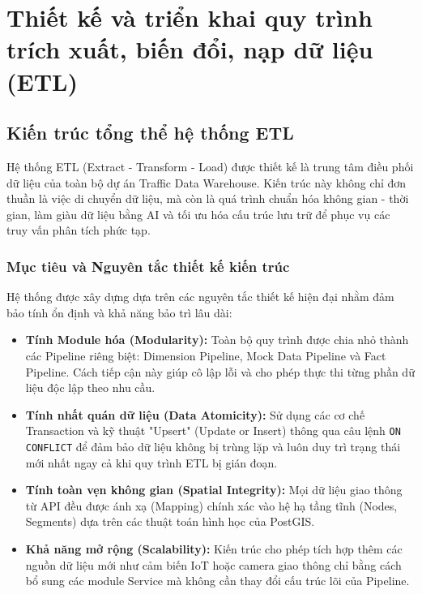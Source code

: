 \section{Thiết kế và triển khai quy trình trích xuất, biến đổi, nạp dữ liệu (ETL)}

\subsection{Kiến trúc tổng thể hệ thống ETL}

Hệ thống ETL (Extract - Transform - Load) được thiết kế là trung tâm điều phối dữ liệu của toàn bộ dự án Traffic Data Warehouse. Kiến trúc này không chỉ đơn thuần là việc di chuyển dữ liệu, mà còn là quá trình chuẩn hóa không gian - thời gian, làm giàu dữ liệu bằng AI và tối ưu hóa cấu trúc lưu trữ để phục vụ các truy vấn phân tích phức tạp.

\subsubsection{Mục tiêu và Nguyên tắc thiết kế kiến trúc}

Hệ thống được xây dựng dựa trên các nguyên tắc thiết kế hiện đại nhằm đảm bảo tính ổn định và khả năng bảo trì lâu dài:

\begin{itemize}
    \item \textbf{Tính Module hóa (Modularity):} Toàn bộ quy trình được chia nhỏ thành các Pipeline riêng biệt: Dimension Pipeline, Mock Data Pipeline và Fact Pipeline. Cách tiếp cận này giúp cô lập lỗi và cho phép thực thi từng phần dữ liệu độc lập theo nhu cầu.
    \item \textbf{Tính nhất quán dữ liệu (Data Atomicity):} Sử dụng các cơ chế Transaction và kỹ thuật "Upsert" (Update or Insert) thông qua câu lệnh \texttt{ON CONFLICT} để đảm bảo dữ liệu không bị trùng lặp và luôn duy trì trạng thái mới nhất ngay cả khi quy trình ETL bị gián đoạn.
    \item \textbf{Tính toàn vẹn không gian (Spatial Integrity):} Mọi dữ liệu giao thông từ API đều được ánh xạ (Mapping) chính xác vào hệ hạ tầng tĩnh (Nodes, Segments) dựa trên các thuật toán hình học của PostGIS.
    \item \textbf{Khả năng mở rộng (Scalability):} Kiến trúc cho phép tích hợp thêm các nguồn dữ liệu mới như cảm biến IoT hoặc camera giao thông chỉ bằng cách bổ sung các module Service mà không cần thay đổi cấu trúc lõi của Pipeline.
\end{itemize}

